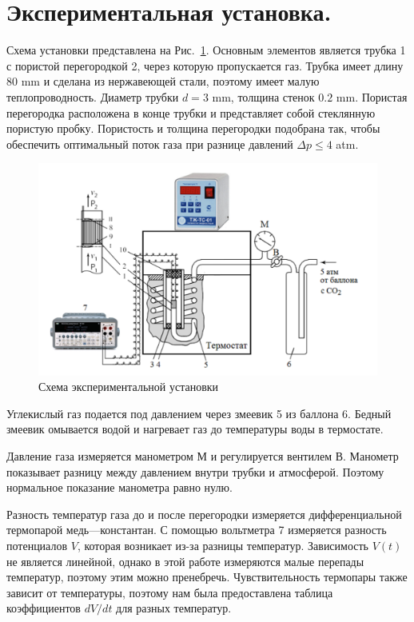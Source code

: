 \documentclass[a4paper,12pt]{report}
\begin{document}
    \section{Экспериментальная установка.}
        Схема установки представлена на Рис.~\ref{fig:1}. Основным элементов является трубка 1 с пористой перегородкой 2, через которую пропускается газ. Трубка имеет длину 80 mm и сделана из нержавеющей стали, поэтому имеет малую теплопроводность. Диаметр трубки $d=3$ mm, толщина стенок $0.2$ mm. Пористая перегородка расположена в конце трубки и представляет собой стеклянную пористую пробку. Пористость и толщина перегородки подобрана так, чтобы обеспечить оптимальный поток газа при разнице давлений $\Delta p \leq 4$ atm.
        \begin{figure}[H]
            \centering
            \includegraphics[width=0.9\linewidth]{../img/ustanovka.png}
            \caption{Схема экспериментальной установки}
            \label{fig:1}
        \end{figure}
        Углекислый газ подается под давлением через змеевик 5 из баллона 6. Бедный змеевик омывается водой и нагревает газ до температуры воды в термостате.

        Давление газа измеряется манометром М и регулируется вентилем В. Манометр показывает разницу между давлением внутри трубки и атмосферой. Поэтому нормальное показание манометра равно нулю.

        Разность температур газа до и после перегородки измеряется дифференциальной термопарой медь---константан. С помощью вольтметра 7 измеряется разность потенциалов $V$, которая возникает из-за разницы температур. Зависимость $V(t)$ не является линейной, однако в этой работе измеряются малые перепады температур, поэтому этим можно пренебречь. Чувствительность термопары также зависит от температуры, поэтому нам была предоставлена таблица коэффициентов $dV/dt$ для разных температур.
    
\end{document}
